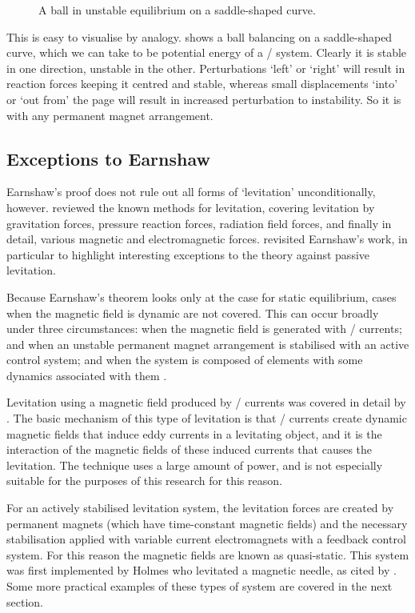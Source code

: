 \begin{figure}
  \caption{A ball in unstable equilibrium on a saddle-shaped curve.}
\end{figure}

This is easy to visualise by analogy.
 shows a ball balancing on a saddle-shaped curve, which we can take to be potential energy of a \twoD/ system.
Clearly it is stable in one direction, unstable in the other.
Perturbations `left' or `right' will result in reaction forces keeping it centred and stable, whereas small displacements `into' or `out from' the page will result in increased perturbation to instability.
So it is with any permanent magnet arrangement.


\subsection{Exceptions to Earnshaw}

Earnshaw's proof does not rule out all forms of `levitation' unconditionally, however.
\textcite{boerdijk1956a} reviewed the known methods for levitation, covering levitation by gravitation forces, pressure reaction forces, radiation field forces, and finally in detail, various magnetic and electromagnetic forces.
\textcite{bassani2006} revisited Earnshaw's work, in particular to highlight interesting exceptions to the theory against passive levitation.

Because Earnshaw's theorem looks only at the case for static equilibrium, cases when the magnetic field is dynamic are not covered.
This can occur broadly under three circumstances: when the magnetic field is generated with \AC/ currents; and when an unstable permanent magnet arrangement is stabilised with an active control system; and when the system is composed of elements with some dynamics associated with them 
.

Levitation using a magnetic field produced by \AC/ currents was covered in detail by \textcite{laithwaite1965}.
The basic mechanism of this type of levitation is that \AC/ currents create dynamic magnetic fields that induce eddy currents in a levitating object, and it is the interaction of the magnetic fields of these induced currents that causes the levitation.
The technique uses a large amount of power, and is not especially suitable for the purposes of this research for this reason.

For an actively stabilised levitation system, the levitation forces are created by permanent magnets (which have time-constant magnetic fields) and the necessary stabilisation applied with variable current electromagnets with a feedback control system.
For this reason the magnetic fields are known as quasi-static.
This system was first implemented by Holmes who levitated a magnetic needle, as cited by \textcite{boerdijk1956a}.
Some more practical examples of these types of system are covered in the next section.

